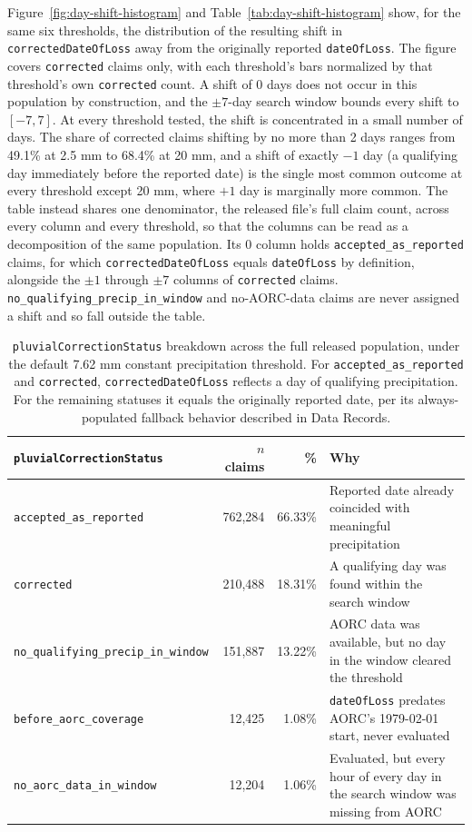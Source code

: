 Figure~\ref{fig:day-shift-histogram} and
Table~\ref{tab:day-shift-histogram} show, for the same six
thresholds, the distribution of the resulting shift in
\texttt{correctedDateOfLoss} away from the originally reported
\texttt{dateOfLoss}. The figure covers \texttt{corrected} claims only,
with each threshold's bars normalized by that threshold's own
\texttt{corrected} count. A shift of 0 days does not occur in this
population by construction, and the $\pm7$-day search window bounds
every shift to $[-7, 7]$. At every threshold tested, the shift is
concentrated in a small number of days. The share of corrected claims
shifting by no more than 2 days ranges from 49.1\% at 2.5 mm to 68.4\%
at 20 mm, and a shift of exactly $-1$ day (a qualifying day
immediately before the reported date) is the single most common
outcome at every threshold except 20 mm, where $+1$ day is marginally
more common. The table instead shares one denominator, the released
file's full claim count, across every column and every threshold, so
that the columns can be read as a decomposition of the same
population. Its $0$ column holds \texttt{accepted\_as\_reported}
claims, for which \texttt{correctedDateOfLoss} equals
\texttt{dateOfLoss} by definition, alongside the $\pm1$ through $\pm7$
columns of \texttt{corrected} claims. \texttt{no\_qualifying\_precip\_in\_window}
and no-AORC-data claims are never assigned a shift and so fall outside
the table.

\begin{table}[H]
\centering
\begin{tabular}{lrr>{\raggedright\arraybackslash}p{5.6cm}}
\toprule
\texttt{pluvialCorrectionStatus} & $n$ claims & \% & Why \\
\midrule
\texttt{accepted\_as\_reported} & 762{,}284 & 66.33\% & Reported date already coincided with meaningful precipitation \\
\texttt{corrected} & 210{,}488 & 18.31\% & A qualifying day was found within the search window \\
\texttt{no\_qualifying\_precip\_in\_window} & 151{,}887 & 13.22\% & AORC data was available, but no day in the window cleared the threshold \\
\texttt{before\_aorc\_coverage} & 12{,}425 & 1.08\% & \texttt{dateOfLoss} predates AORC's 1979-02-01 start, never evaluated \\
\texttt{no\_aorc\_data\_in\_window} & 12{,}204 & 1.06\% & Evaluated, but every hour of every day in the search window was missing from AORC \\
\bottomrule
\end{tabular}
\caption{\texttt{pluvialCorrectionStatus} breakdown across the full
released population, under the default 7.62 mm constant precipitation
threshold. For \texttt{accepted\_as\_reported} and
\texttt{corrected}, \texttt{correctedDateOfLoss} reflects a day of
qualifying precipitation. For the remaining statuses it equals the
originally reported date, per its always-populated fallback behavior
described in Data Records.}
\label{tab:pluvial-correction-status}
\end{table}

